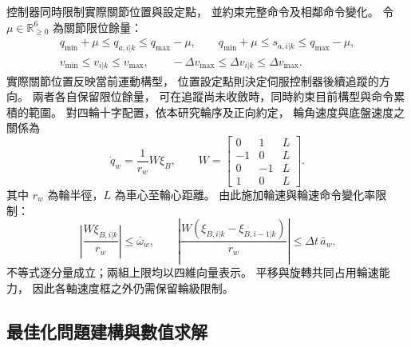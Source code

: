 控制器同時限制實際關節位置與設定點，
並約束完整命令及相鄰命令變化。
令 $\mu\in\mathbb R_{\geq0}^{6}$ 為關節限位餘量：
\begin{equation}
    \begin{gathered}
        q_{\min}+\mu\leq q_{a,i|k}\leq q_{\max}-\mu,\qquad
        q_{\min}+\mu\leq s_{a,i|k}\leq q_{\max}-\mu,\\
        v_{\min}\leq v_{i|k}\leq v_{\max},\qquad
        -\Delta v_{\max}\leq\Delta v_{i|k}\leq\Delta v_{\max}.
    \end{gathered}
    \label{eq:ch3_joint_command_limits}
\end{equation}
實際關節位置反映當前運動構型，
位置設定點則決定伺服控制器後續追蹤的方向。
兩者各自保留限位餘量，
可在追蹤尚未收斂時，同時約束目前構型與命令累積的範圍。
對四輪十字配置，依本研究輪序及正向約定，
輪角速度與底盤速度之關係為
\begin{equation}
    \dot q_w=\frac{1}{r_w}W\xi_B,\qquad
    W=
    \begin{bmatrix}
        0&1&L\\-1&0&L\\0&-1&L\\1&0&L
    \end{bmatrix}.
    \label{eq:ch3_wheel_command_mapping}
\end{equation}
其中 $r_w$ 為輪半徑，$L$ 為車心至輪心距離。
由此施加輪速與輪速命令變化率限制：
\begin{equation}
    \left|\frac{W\xi_{B,i|k}}{r_w}\right|\leq\bar\omega_w,\qquad
    \left|\frac{W(\xi_{B,i|k}-\xi_{B,i-1|k})}{r_w}\right|
    \leq\Delta t\,\bar a_w .
    \label{eq:ch3_wheel_speed_acceleration_limits}
\end{equation}
不等式逐分量成立；兩組上限均以四維向量表示。
平移與旋轉共同占用輪速能力，
因此各軸速度框之外仍需保留輪級限制。

\subsection{最佳化問題建構與數值求解}
\label{subsec:wholebody_qp_formulation}


